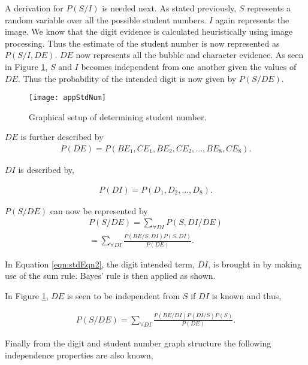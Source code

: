 A derivation for $P(S/I)$ is needed next. As stated previously, $S$ represents a random variable over all the possible student numbers. $I$ again represents the image. We know that the digit evidence is calculated heuristically using image processing. Thus the estimate of the student number is now represented as $P(S/I,DE)$. $DE$ now represents all the bubble and character evidence. As seen in Figure \ref{fig:stdNum}, $S$ and $I$ becomes independent from one another given the values of $DE$. Thus the probability of the intended digit is now given by $P(S/DE)$.

\begin{figure}
  \centering
  \texttt{[image: appStdNum]}\\
  \caption{Graphical setup of determining student number.}
  \label{fig:stdNum}
\end{figure}

$DE$ is further described by 
\begin{align}
  P(DE) =  P(BE_1,CE_1,BE_2,CE_2,...,BE_8,CE_8).
\label{eqn:ansIndep}
\end{align}

$DI$ is described by,

\begin{align}
  P(DI) =  P(D_1,D_2,...,D_8).
\label{eqn:ansIndep2}
\end{align}

$P(S/DE)$ can now be represented by
\begin{align}
  P(S/DE)	=  \sum_{\forall DI}^{}  P(S,DI/DE)\\
  					=  \sum_{\forall DI}^{}  \frac{P(BE/S,DI)P(S,DI)}{P(DE)}.
\label{eqn:stdEqn2}
\end{align}

In Equation \ref{eqn:stdEqn2}, the digit intended term, $DI$, is brought in by making use of the sum rule. Bayes' rule is then applied as shown.

In Figure \ref{fig:stdNum}, $DE$ is seen to be independent from $S$ if $DI$ is known and thus,

\begin{align}
  P(S/DE)	=  \sum_{\forall DI}^{}  \frac{P(BE/DI)P(DI/S)P(S)}{P(DE)}.
\label{eqn:stdEqn3}
\end{align}

Finally from the digit and student number graph structure the following independence properties are also known,

